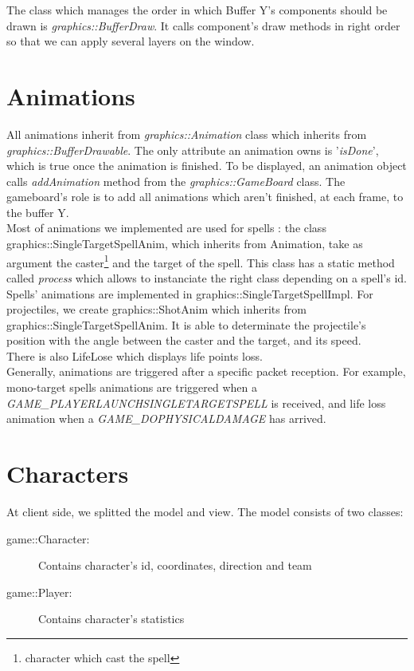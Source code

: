 \documentclass{scrreprt}
\begin{document}
			The class which manages the order in which Buffer Y's components should be drawn is \emph{graphics::BufferDraw}. It calls component's draw methods in right order so that we can apply several layers on the window.

			\section{Animations}
			All animations inherit from \emph{graphics::Animation} class which inherits from \emph{graphics::BufferDrawable}. The only attribute an animation owns is '\emph{isDone}', which is true once the animation is finished. To be displayed, an animation object calls \emph{addAnimation} method from the \emph{graphics::GameBoard} class. The gameboard's role is to add all animations which aren't finished, at each frame, to the buffer Y.\\

			Most of animations we implemented are used for spells : the class graphics::SingleTargetSpellAnim, which inherits from Animation, take as argument the caster\footnote{character which cast the spell} and the target of the spell. This class has a static method called \emph{process} which allows to instanciate the right class depending on a spell's id.\\
			Spells' animations are implemented in graphics::SingleTargetSpellImpl. For projectiles, we create graphics::ShotAnim which inherits from graphics::SingleTargetSpellAnim. It is able to determinate the projectile's position with the angle between the caster and the target, and its speed.\\
			There is also LifeLose which displays life points loss.\\
				
				Generally, animations are triggered after a specific packet reception. For example, mono-target spells animations are triggered when a \emph{GAME\_PLAYERLAUNCHSINGLETARGETSPELL} is received, and life loss animation when a \emph{GAME\_DOPHYSICALDAMAGE} has arrived.

				\section{Characters}
				At client side, we splitted the model and view. The model consists of two classes:
				\begin{description}
				\item[game::Character:]{Contains character's id, coordinates, direction and team}
				\item[game::Player:]{Contains character's statistics}
				\end{description}
\end{document}
